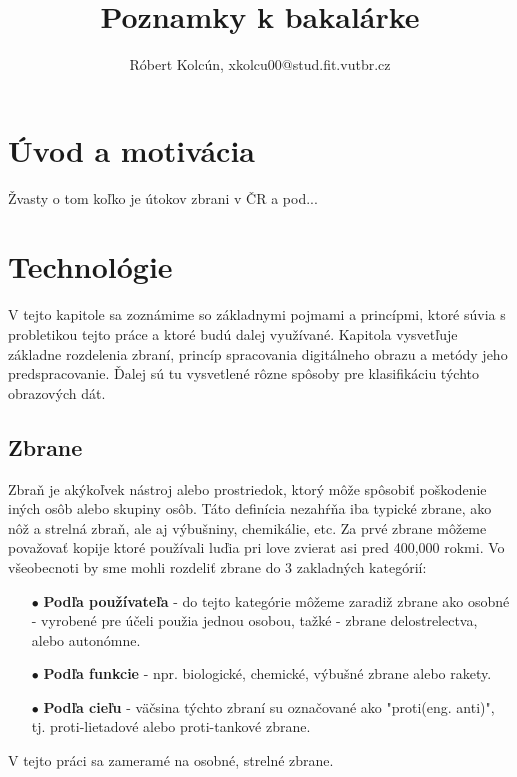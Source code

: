 \documentclass[10pt,a4paper]{article}
\begin{document}
\title{Poznamky k bakalárke}
\author{Róbert Kolcún, xkolcu00@stud.fit.vutbr.cz}
\maketitle


\section{Úvod a motivácia}
Žvasty o tom koľko je útokov zbrani v ČR a pod...


\section{Technológie}

V tejto kapitole sa zoznámime so základnymi pojmami a princípmi, ktoré súvia s probletikou tejto práce a ktoré budú dalej využívané.
Kapitola vysvetľuje základne rozdelenia zbraní, princíp spracovania digitálneho obrazu a metódy jeho predspracovanie.
Ďalej sú tu vysvetlené rôzne spôsoby pre klasifikáciu týchto obrazových dát.


\subsection{Zbrane}
Zbraň je akýkoľvek nástroj alebo prostriedok, ktorý môže spôsobiť poškodenie iných osôb alebo skupiny osôb.
Táto definícia nezahŕňa iba typické zbrane, ako nôž a strelná zbraň, ale aj výbušniny, chemikálie, etc.
Za prvé zbrane môžeme považovať kopije ktoré používali luďia pri love zvierat asi pred 400,000 rokmi\cite{prop:SpearHistory}.
Vo všeobecnoti by sme mohli rozdeliť zbrane do 3 zakladných kategórií:
\begin{enumerate}
	\item[$\bullet$] \textbf{Podľa používateľa} - do tejto kategórie môžeme zaradiž zbrane ako osobné - vyrobené pre účeli použia jednou osobou, tažké - zbrane delostrelectva,  alebo autonómne.
	\item[$\bullet$] \textbf{Podľa funkcie} - npr. biologické, chemické, výbušné zbrane alebo rakety.
    \item[$\bullet$] \textbf{Podľa cieľu} - väčsina týchto zbraní su označované ako "proti(eng. anti)", tj. proti-lietadové alebo proti-tankové zbrane.
\end{enumerate}
V tejto práci sa zameramé na osobné, strelné zbrane.
\end{document}
